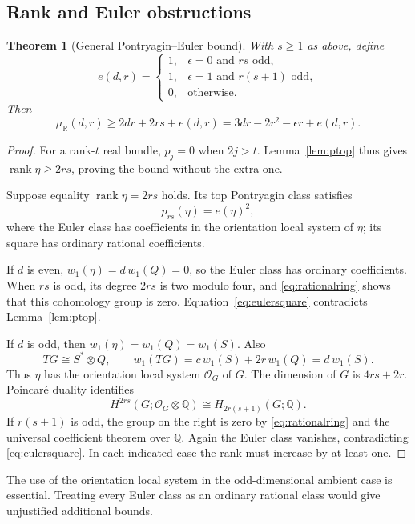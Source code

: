 \documentclass[11pt]{article}
\newtheorem{theorem}{Theorem}[section]
\theoremstyle{definition}
\newcommand{\R}{\mathbb R}
\newcommand{\Q}{\mathbb Q}
\newcommand{\rank}{\operatorname{rank}}
\newcommand{\muR}{\mu_{\R}}
\newcommand{\oc}{\mathcal O}
\begin{document}
\subsection{Rank and Euler obstructions}
\begin{theorem}[General Pontryagin--Euler bound]\label{thm:pontryagin}
With $s\geq1$ as above, define
\[
 e(d,r)=\begin{cases}
 1,&\epsilon=0\text{ and }rs\text{ odd},\\
 1,&\epsilon=1\text{ and }r(s+1)\text{ odd},\\
 0,&\text{otherwise}.
 \end{cases}
\]
Then
\begin{equation}\label{eq:pontryaginbound}
 \boxed{\muR(d,r)\geq2dr+2rs+e(d,r)
 =3dr-2r^2-\epsilon r+e(d,r).}
\end{equation}
\end{theorem}
\begin{proof}
For a rank-$t$ real bundle, $p_j=0$ when $2j>t$. Lemma~\ref{lem:ptop} thus gives $\rank\eta\geq2rs$, proving the bound without the extra one.

Suppose equality $\rank\eta=2rs$ holds. Its top Pontryagin class satisfies
\begin{equation}\label{eq:eulersquare}
 p_{rs}(\eta)=e(\eta)^2,
\end{equation}
where the Euler class has coefficients in the orientation local system of $\eta$; its square has ordinary rational coefficients.

If $d$ is even, $w_1(\eta)=d\,w_1(Q)=0$, so the Euler class has ordinary coefficients. When $rs$ is odd, its degree $2rs$ is two modulo four, and \eqref{eq:rationalring} shows that this cohomology group is zero. Equation~\eqref{eq:eulersquare} contradicts Lemma~\ref{lem:ptop}.

If $d$ is odd, then $w_1(\eta)=w_1(Q)=w_1(S)$. Also
\[
 TG\cong S^*\otimes Q,\qquad
 w_1(TG)=c\,w_1(S)+2r\,w_1(Q)=d\,w_1(S).
\]
Thus $\eta$ has the orientation local system $\oc_G$ of $G$. The dimension of $G$ is $4rs+2r$. Poincar\'e duality identifies
\[
 H^{2rs}(G;\oc_G\otimes\Q)\cong H_{2r(s+1)}(G;\Q).
\]
If $r(s+1)$ is odd, the group on the right is zero by \eqref{eq:rationalring} and the universal coefficient theorem over $\Q$. Again the Euler class vanishes, contradicting \eqref{eq:eulersquare}. In each indicated case the rank must increase by at least one.
\end{proof}

The use of the orientation local system in the odd-dimensional ambient case is essential. Treating every Euler class as an ordinary rational class would give unjustified additional bounds.
\end{document}

